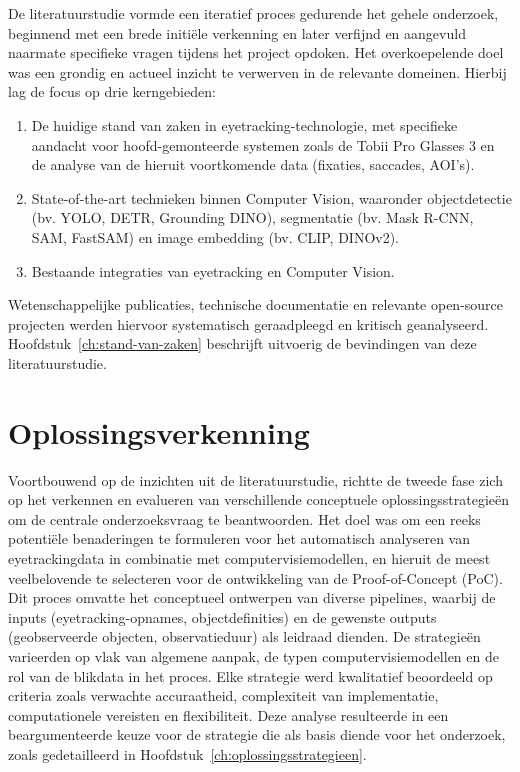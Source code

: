 De literatuurstudie vormde een iteratief proces gedurende het gehele onderzoek, beginnend met een brede initiële verkenning en 
later verfijnd en aangevuld naarmate specifieke vragen tijdens het project opdoken. 
Het overkoepelende doel was een grondig en actueel inzicht te verwerven in de relevante domeinen. 
Hierbij lag de focus op drie kerngebieden: 
\begin{enumerate}
\item De huidige stand van zaken in eyetracking-technologie, met specifieke aandacht voor hoofd-gemonteerde systemen zoals de Tobii Pro Glasses 3 en de analyse van de hieruit voortkomende data (fixaties, saccades, AOI's).
\item State-of-the-art technieken binnen Computer Vision, waaronder objectdetectie (bv. YOLO, DETR, Grounding DINO), segmentatie (bv. Mask R-CNN, SAM, FastSAM) en image embedding (bv. CLIP, DINOv2).
\item Bestaande integraties van eyetracking en Computer Vision.
\end{enumerate}
Wetenschappelijke publicaties, technische documentatie en relevante open-source projecten werden hiervoor systematisch 
geraadpleegd en kritisch geanalyseerd.
Hoofdstuk~\ref{ch:stand-van-zaken} beschrijft uitvoerig de bevindingen van deze literatuurstudie.


\section{Oplossingsverkenning}

Voortbouwend op de inzichten uit de literatuurstudie, richtte de tweede fase zich op het verkennen en evalueren van verschillende 
conceptuele oplossingsstrategieën om de centrale onderzoeksvraag te beantwoorden. 
Het doel was om een reeks potentiële benaderingen te formuleren voor het automatisch analyseren 
van eyetrackingdata in combinatie met computervisiemodellen, en hieruit de meest veelbelovende te 
selecteren voor de ontwikkeling van de Proof-of-Concept (PoC). 
Dit proces omvatte het conceptueel ontwerpen van diverse pipelines, waarbij de inputs (eyetracking-opnames, objectdefinities) 
en de gewenste outputs (geobserveerde objecten, observatieduur) als leidraad dienden. 
De strategieën varieerden op vlak van algemene aanpak, de typen computervisiemodellen 
en de rol van de blikdata in het proces. 
Elke strategie werd kwalitatief beoordeeld op criteria zoals verwachte accuraatheid, complexiteit van implementatie, 
computationele vereisten en flexibiliteit. 
Deze analyse resulteerde in een beargumenteerde keuze voor de strategie die als basis diende voor het onderzoek, 
zoals gedetailleerd in Hoofdstuk~\ref{ch:oplossingsstrategieen}.

